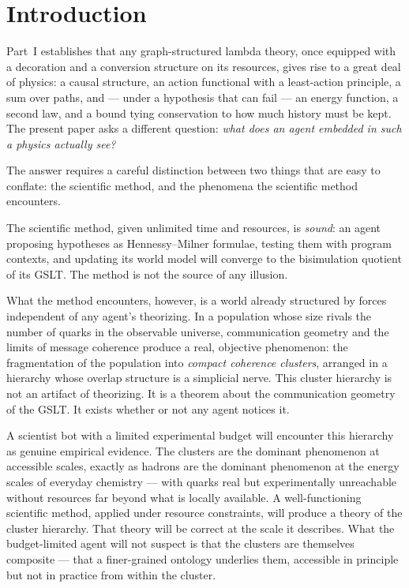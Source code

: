 \chapter{Introduction}

Part~I establishes that any
graph-structured lambda theory, once equipped with a decoration and a
conversion structure on its resources, gives rise to a great deal of
physics: a causal structure, an action functional with a least-action
principle, a sum over paths, and --- under a hypothesis that can fail ---
an energy function, a second law, and a bound tying conservation to how
much history must be kept.
The present paper asks a different question: \emph{what does an agent
embedded in such a physics actually see?}

The answer requires a careful distinction between two things that
are easy to conflate: the scientific method, and the phenomena
the scientific method encounters.

The scientific method, given unlimited time and resources, is
\emph{sound}: an agent proposing hypotheses as Hennessy--Milner
formulae, testing them with program contexts, and updating its
world model will converge to the bisimulation quotient of its GSLT.
The method is not the source of any illusion.

What the method encounters, however, is a world already structured
by forces independent of any agent's theorizing.
In a population whose size rivals the number of quarks in the
observable universe, communication geometry and the limits of
message coherence produce a real, objective phenomenon: the
fragmentation of the population into \emph{compact coherence
clusters}, arranged in a hierarchy whose overlap structure is a
simplicial nerve.
This cluster hierarchy is not an artifact of theorizing.
It is a theorem about the communication geometry of the GSLT.
It exists whether or not any agent notices it.

A scientist bot with a limited experimental budget will encounter
this hierarchy as genuine empirical evidence.
The clusters are the dominant phenomenon at accessible scales,
exactly as hadrons are the dominant phenomenon at the energy scales
of everyday chemistry --- with quarks real but experimentally
unreachable without resources far beyond what is locally available.
A well-functioning scientific method, applied under resource
constraints, will produce a theory of the cluster hierarchy.
That theory will be correct at the scale it describes.
What the budget-limited agent will not suspect is that the
clusters are themselves composite --- that a finer-grained
ontology underlies them, accessible in principle but not in
practice from within the cluster.

